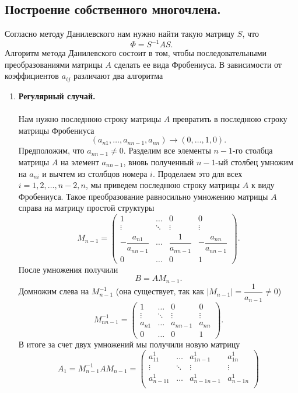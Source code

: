 \documentclass[a4paper, 12pt]{report}
\begin{document}
	 \subsection{Построение собственного многочлена.}
	 Согласно методу Данилевского нам нужно найти такую матрицу $S$, что $$\Phi = S^{-1}AS.$$
	 Алгоритм метода Данилевского состоит в том, чтобы последовательными преобразованиями матрицы $A$ сделать ее вида Фробениуса. В зависимости от коэффициентов $a_{ij}$ различают два алгоритма\begin{enumerate}
	 	\item \textbf{Регулярный случай.}\\\\
	 	Нам нужно последнюю строку матрицы $A$ превратить в последнюю строку матрицы Фробениуса $$(a_{n1},\ldots, a_{nn-1},a_{nn})\to(0, \ldots, 1, 0).$$
	 	Предположим, что $a_{nn-1} \ne 0.$
	 	Разделим все элементы $n-1$-го столбца матрицы $A$ на элемент $a_{nn-1}$, вновь полученный $n-1$-ый столбец умножим на $a_{ni}$ и вычтем из столбцов номера $i$. Проделаем это для всех $i = 1,2,\ldots, n-2, n$, мы приведем последнюю строку матрицы $A$ к виду Фробениуса. Такое преобразование равносильно умножению матрицы $A$ справа на матрицу простой структуры $$M_{n-1} = \begin{pmatrix}
	 	1 & \ldots & 0 & 0\\
	 	\vdots & \ddots & \vdots & \vdots\\
	 	-\dfrac{a_{n1}}{a_{nn-1}} & \ldots & \dfrac{1}{a_{nn-1}} & -\dfrac{a_{nn}}{a_{nn-1}}\\
	 	0 & \ldots & 0 & 1
	 	\end{pmatrix}.$$
	 	После умножения получили $$B = AM_{n-1}.$$
	 	Домножим слева на $M^{-1}_{n-1}$ (она существует, так как $|M_{n-1}| = \dfrac{1}{a_{n-1}}\ne 0$) $$M^{-1}_{nn-1} = \begin{pmatrix}
	 	1 & \ldots & 0 & 0\\
	 	\vdots & \ddots & \vdots & \vdots\\
	 	a_{n1} & \ldots &a_{nn-1} & a_{nn}\\
	 	0 & \ldots & 0 & 1
	 	\end{pmatrix}.$$
	 	В итоге за счет двух умножений мы получили новую матрицу $$A_{1} = M_{n-1}^{-1}AM_{n-1} = \begin{pmatrix}
	 	a_{11}^1 & \ldots &a_{1n-1}^1& a_{1n}^1\\
	 	\vdots & \ddots & \vdots & \vdots \\
	 	a_{n-11}^1 &\ldots & a_{n-1n-1}^1 & a_{n-1n}^1\\

\end{pmatrix}$$
\end{enumerate}
\end{document}
